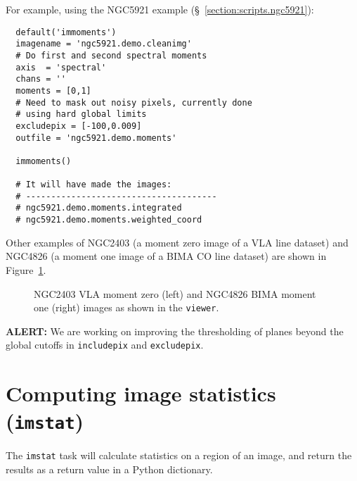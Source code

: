 For example, using the NGC5921 example (\S~\ref{section:scripts.ngc5921}):
\small
\begin{verbatim}
  default('immoments')
  imagename = 'ngc5921.demo.cleanimg'
  # Do first and second spectral moments
  axis  = 'spectral'
  chans = ''
  moments = [0,1]
  # Need to mask out noisy pixels, currently done
  # using hard global limits
  excludepix = [-100,0.009]
  outfile = 'ngc5921.demo.moments'
  
  immoments()
  
  # It will have made the images:
  # --------------------------------------
  # ngc5921.demo.moments.integrated
  # ngc5921.demo.moments.weighted_coord
\end{verbatim}
\normalsize

Other examples of NGC2403 (a moment zero image of a VLA line dataset)
and NGC4826 (a moment one image of a BIMA CO line dataset) are
shown in Figure~\ref{fig:n2403momzero}.

\begin{figure}[h!]
\begin{center}
\caption{\label{fig:n2403momzero} NGC2403 VLA moment zero (left) and
NGC4826 BIMA moment one (right) images as shown in the {\tt viewer}.}
\hrulefill
\end{center}
\end{figure}

{\bf ALERT:} We are working on improving the thresholding
of planes beyond the global cutoffs in {\tt includepix}
and {\tt excludepix}.

\section{Computing image statistics ({\tt imstat})}
\label{section:analysis.imstat}

The {\tt imstat} task will calculate statistics on a region of
an image, and return the results as a return value in a Python
dictionary.

